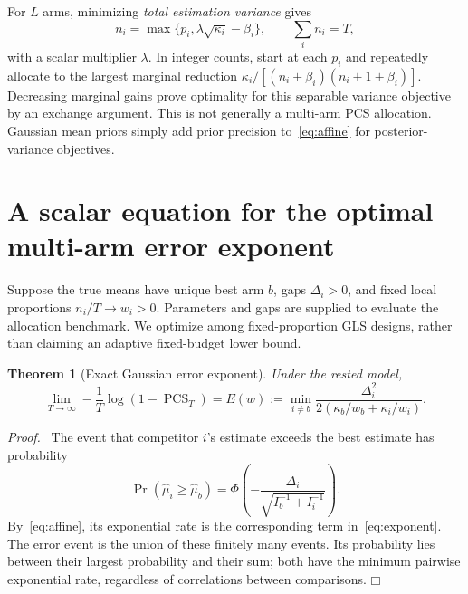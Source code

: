 \documentclass[11pt]{article}
\newtheorem{theorem}{Theorem}
\newenvironment{proof}{\par\noindent\textit{Proof.}\ }{\hfill$\mdlgwhtsquare$\par\medskip}
\newcommand{\PCS}{\operatorname{PCS}}
\begin{document}
For $L$ arms, minimizing \emph{total estimation variance} gives
\begin{equation}
n_i=\max\{p_i,\lambda\sqrt{\kappa_i}-\beta_i\},\qquad
\sum_i n_i=T,
\end{equation}
with a scalar multiplier $\lambda$. In integer counts, start at each $p_i$ and repeatedly allocate to the largest marginal reduction
$\kappa_i/[(n_i+\beta_i)(n_i+1+\beta_i)]$. Decreasing marginal gains prove optimality for this separable variance objective by an exchange argument. This is not generally a multi-arm PCS allocation. Gaussian mean priors simply add prior precision to~\eqref{eq:affine} for posterior-variance objectives.

\section{A scalar equation for the optimal multi-arm error exponent}
Suppose the true means have unique best arm $b$, gaps $\Delta_i>0$, and fixed local proportions $n_i/T\to w_i>0$. Parameters and gaps are supplied to evaluate the allocation benchmark. We optimize among fixed-proportion GLS designs, rather than claiming an adaptive fixed-budget lower bound.

\begin{theorem}[Exact Gaussian error exponent]
Under the rested model,
\begin{equation}
\lim_{T\to\infty}-\frac1T\log(1-\PCS_T)
=E(w):=\min_{i\ne b}\frac{\Delta_i^2}
{2(\kappa_b/w_b+\kappa_i/w_i)}.
\label{eq:exponent}
\end{equation}
\end{theorem}
\begin{proof}
The event that competitor $i$'s estimate exceeds the best estimate has probability
\[
\Pr(\widehat\mu_i\geq\widehat\mu_b)
=\Phi\left(-\frac{\Delta_i}{\sqrt{I_b^{-1}+I_i^{-1}}}\right).
\]
By~\eqref{eq:affine}, its exponential rate is the corresponding term in~\eqref{eq:exponent}. The error event is the union of these finitely many events. Its probability lies between their largest probability and their sum; both have the minimum pairwise exponential rate, regardless of correlations between comparisons.
\end{proof}
\end{document}
